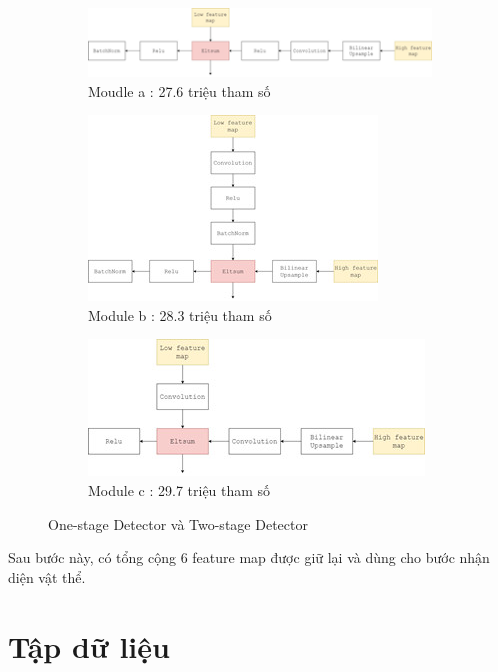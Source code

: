 \documentclass[a4paper]{article}
\begin{document}
\begin{figure} [h]
	\centering
	\begin{subfigure}{0.45\textwidth}
		\centering
		\includegraphics[width=0.7\linewidth]{fig/z5092847759693_0b41e43af0b0e40899f7c6db8b5e54b7}
		\caption{Moudle a : 27.6 triệu tham số}
		\label{fig:modulea}
	\end{subfigure}
	\begin{subfigure}{0.45\textwidth}
		\centering
		\includegraphics[width=0.7\linewidth]{fig/z5092847943183_94e9a29d3eb127c6d251749201fb7c7b}
		\caption{Module b : 28.3 triệu tham số}
		\label{fig:moduleb}
	\end{subfigure}
	\begin{subfigure}{0.45\textwidth}
		\centering
		\includegraphics[width=0.7\linewidth]{fig/z5092848171130_735bb59cbabaaa9eb7e44a48ee39f110}
		\caption{Module c : 29.7 triệu tham số}
		\label{fig:modulec}
	\end{subfigure}
	\caption{One-stage Detector và Two-stage Detector}
	\label{fig:onestageandtwostage}
\end{figure}

Sau bước này, có tổng cộng 6 feature map được giữ lại và dùng cho bước nhận diện vật thể.

\section{\textbf{Tập dữ liệu}}
\end{document}
